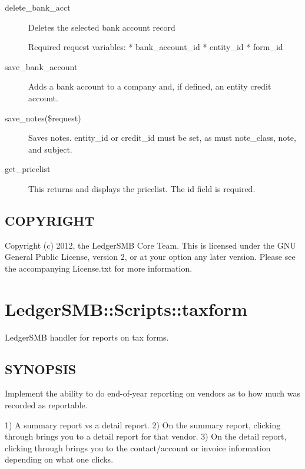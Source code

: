 \begin{description}
\begin{description}
\item[{delete\_bank\_acct}] \mbox{}

Deletes the selected bank account record



Required request variables:
* bank\_account\_id
* entity\_id
* form\_id


\item[{save\_bank\_account}] \mbox{}

Adds a bank account to a company and, if defined, an entity credit account.


\item[{save\_notes(\$request)}] \mbox{}

Saves notes.  entity\_id or credit\_id must be set, as must note\_class, note, and 
subject.


\item[{get\_pricelist}] \mbox{}

This returns and displays the pricelist.  The id field is required.

\end{description}
\subsection*{COPYRIGHT\label{LedgerSMB::Scripts::contact_COPYRIGHT}}


Copyright (c) 2012, the LedgerSMB Core Team.  This is licensed under the GNU 
General Public License, version 2, or at your option any later version.  Please 
see the accompanying License.txt for more information.

\section{LedgerSMB::Scripts::taxform\label{LedgerSMB::Scripts::taxform}}


LedgerSMB handler for reports on tax forms.

\subsection*{SYNOPSIS\label{LedgerSMB::Scripts::taxform_SYNOPSIS}}


Implement the ability to do end-of-year reporting on vendors as to how
much was recorded as reportable.



1) A summary report vs a detail report. 2) On the summary report, clicking
through brings you to a detail report for that vendor. 3) On the detail
report, clicking through brings you to the contact/account or invoice
information depending on what one clicks.


\end{description}
